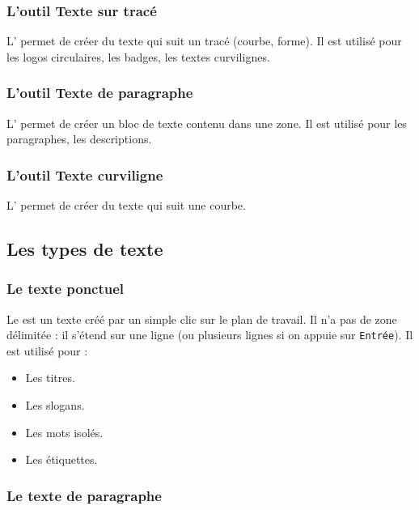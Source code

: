 \subsubsection{L'outil Texte sur tracé}

L' permet de créer du texte qui suit un tracé (courbe, forme). Il est utilisé pour les logos circulaires, les badges, les textes curvilignes.

\subsubsection{L'outil Texte de paragraphe}

L' permet de créer un bloc de texte contenu dans une zone. Il est utilisé pour les paragraphes, les descriptions.

\subsubsection{L'outil Texte curviligne}

L' permet de créer du texte qui suit une courbe.

\subsection{Les types de texte}

\subsubsection{Le texte ponctuel}

Le  est un texte créé par un simple clic sur le plan de travail. Il n'a pas de zone délimitée : il s'étend sur une ligne (ou plusieurs lignes si on appuie sur \texttt{Entrée}). Il est utilisé pour :

\begin{itemize}
    \item Les titres.
    \item Les slogans.
    \item Les mots isolés.
    \item Les étiquettes.
\end{itemize}

\subsubsection{Le texte de paragraphe}

